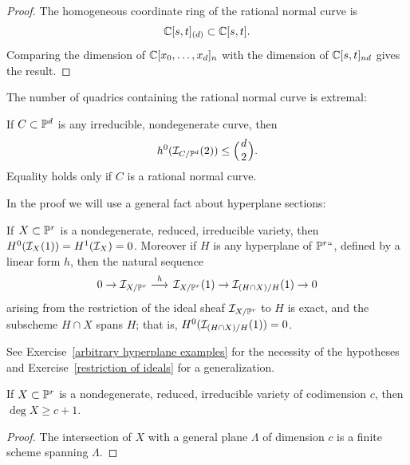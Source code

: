 \begin{proof}
The 
homogeneous coordinate ring
%
of the rational normal curve is 
$${\mathbb C}[s,t]_{(d)}\subset {\mathbb C}[s,t].$$ 
Comparing the dimension
of ${\mathbb C}[x_0,\dots,x_d]_n$ with the dimension of ${\mathbb C}[s,t]_{nd}$ gives the result.
\end{proof}

The number of quadrics containing the
rational normal curve
%
is extremal:
%
%

\begin{proposition}\label{rnc on most quadrics}
If $C \subset {\mathbb P}^d$ is any irreducible, nondegenerate curve, then
$$
h^0(\cI_{C/\PP^d}(2)) \leq  \mbinom{d}{2}.
$$
Equality holds only if
$C$ is a rational normal curve.
\unif
\end{proposition}

In the proof we will use a general fact about hyperplane sections:
%

\begin{proposition}\label{arbitrary hyperplane}
If $\kern1ptX\subset {\mathbb P}^r$ is a nondegenerate, reduced, irreducible variety, 
then $H^0(\mathcal I_X(1)) = H^1 (\mathcal I_X) = 0$. 
Moreover if $H$ is any hyperplane of ${\mathbb P}^r` `$, defined by
a linear form $h$, then the natural
sequence
$$
0\to \sI_{X/\PP^r} \ruto {\ h} \sI_{X/\PP^r}(1)\to \sI_{(H\cap X)/H}(1)\to 0
$$
arising from the restriction of the ideal sheaf $\mathcal I_{X/{\mathbb P}^r}$ to $H$ is exact, and the subscheme
$H\cap X$ spans $H$; that is, $H^0(\mathcal I_{(H\cap X)/H}(1)) = 0$.
\unif
\end{proposition}

See Exercise~\ref{arbitrary hyperplane examples} for the necessity of the hypotheses
and Exercise~\ref{restriction of ideals} for a generalization. 

\begin{corollary}\label{minimal degree bound}
If $X\subset {\mathbb P}^r$ is a nondegenerate, reduced, irreducible variety of codimension $c$, then $\deg X \geq c+1$.
\unif
\end{corollary}

\begin{proof}
 The intersection of $X$ with a general plane $\Lambda$ of dimension $c$ is a finite scheme spanning $\Lambda$.
\unif
\end{proof}

